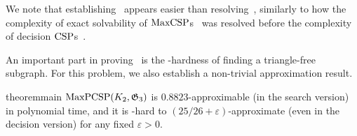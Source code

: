 \documentclass[a4paper,11pt, DIV=11]{scrartcl}
\renewcommand{\epsilon}{\varepsilon}
\renewcommand{\G}{\ensuremath{\mathfrak{G}}}
\DeclareMathOperator{\maxPCSP}{\textup{MaxPCSP}}
\DeclareMathOperator{\maxCSP}{\textup{MaxCSP}}
\DeclareMathOperator{\CSP}{\textup{CSP}}
\theoremstyle{plain}
\theoremstyle{definition}
\begin{document}
We note that establishing~ appears easier than
resolving~, similarly to how the complexity of exact solvability of 
$\maxCSP$s~\cite{TZ16:jacm} was resolved before the complexity of decision
$\CSP$s~\cite{Bulatov17:focs,Zhuk20:jacm}.

\medskip
An important part in proving~ is the \NP-hardness of finding a triangle-free subgraph.
For this problem,  we also establish a non-trivial approximation result.

\begin{restatable}{theorem}{main}\label{thm:main}
$\maxPCSP(K_2, \G_3)$ is $0.8823$-approximable (in the search version) in polynomial time, and it is \NP-hard to $(25 / 26+\epsilon)$-approximate (even in the decision version) for any fixed $\epsilon > 0$.
\end{restatable}
\end{document}
